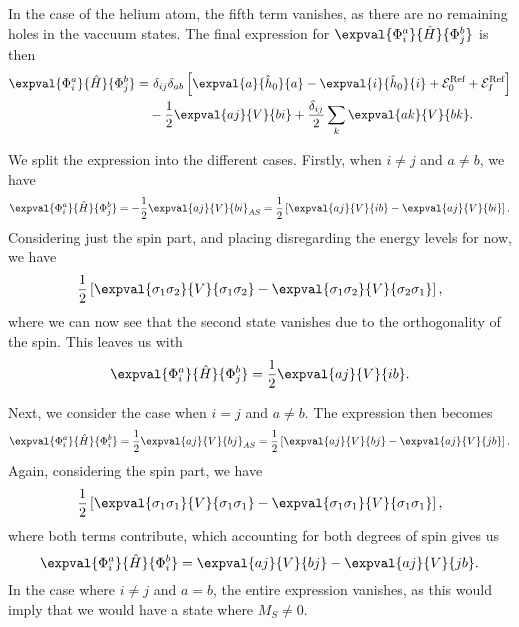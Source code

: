 In the case of the helium atom, the fifth term vanishes, as there are no remaining holes in the vaccuum states. %
The final expression for $\expval{\Phi_i^a}{\hat{H}}{\Phi_j^b}$ is then
\begin{equation}\label{eq:1p1h-1p1h}
    \begin{split}
        \expval{\Phi_i^a}{\hat{H}}{\Phi_j^b}
        =& \ \delta_{ij} \delta_{ab} \left[
            \expval{a}{\hat{h}_0}{a}
            - \expval{i}{\hat{h}_0}{i}
            + \mathcal{E}_0^{\text{Ref}}
            + \mathcal{E}_I^{\text{Ref}}
        \right] \\
        &- \frac{1}{2} \expval{a j}{V}{b i}
        + \frac{\delta_{ij}}{2} \sum_{k} \expval{a k}{V}{b k}.
    \end{split}
\end{equation}

We split the expression into the different cases.
Firstly, when $i \neq j$ and $a \neq b$, we have
\begin{equation*}
    \expval{\Phi_i^a}{\hat{H}}{\Phi_j^b} = -\frac{1}{2} \expval{aj}{V}{bi}_{AS} = \frac{1}{2} \left[ \expval{aj}{V}{ib} - \expval{aj}{V}{bi} \right].
\end{equation*}
Considering just the spin part, and placing disregarding the energy levels for now, we have
\begin{equation*}
    \frac{1}{2} \left[ \expval{\sigma_1 \sigma_2}{V}{\sigma_1 \sigma_2} - \expval{\sigma_1 \sigma_2}{V}{\sigma_2 \sigma_1} \right],
\end{equation*}
where we can now see that the second state vanishes due to the orthogonality of the spin. %
This leaves us with
\begin{equation*}
    \expval{\Phi_i^a}{\hat{H}}{\Phi_j^b} = \frac{1}{2} \expval{aj}{V}{ib}.
\end{equation*}

Next, we consider the case when $i = j$ and $a \neq b$.
The expression then becomes
\begin{equation*}
    \expval{\Phi_i^a}{\hat{H}}{\Phi_i^b} = \frac{1}{2} \expval{aj}{V}{bj}_{AS} = \frac{1}{2} \left[ \expval{aj}{V}{bj} - \expval{aj}{V}{jb} \right].
\end{equation*}
Again, considering the spin part, we have
\begin{equation*}
    \frac{1}{2} \left[ \expval{\sigma_1 \sigma_1}{V}{\sigma_1 \sigma_1} - \expval{\sigma_1 \sigma_1}{V}{\sigma_1 \sigma_1} \right],
\end{equation*}
where both terms contribute, which accounting for both degrees of spin gives us
\begin{equation*}
    \expval{\Phi_i^a}{\hat{H}}{\Phi_i^b} = \expval{aj}{V}{bj} - \expval{aj}{V}{jb}.
\end{equation*}
In the case where $i \neq j$ and $a = b$, the entire expression vanishes, as this would imply that we would have a state where $M_S \neq 0$.

